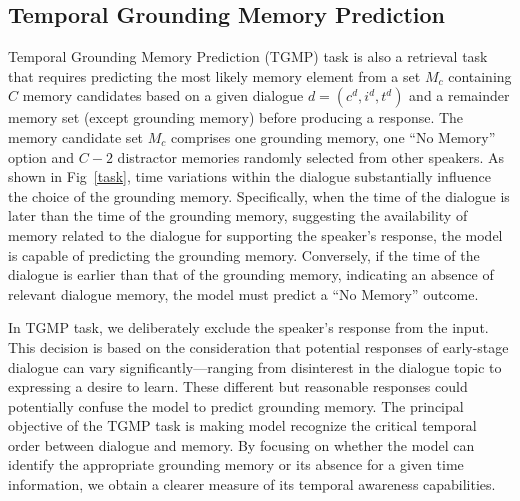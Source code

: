 

\subsection{Temporal Grounding Memory Prediction}

Temporal Grounding Memory Prediction (TGMP) task is also a retrieval task that requires predicting the most likely memory element from a set $M_c$ containing $C$ memory candidates based on a given dialogue $d=(c^{d}, {i}^{d}, t^{d})$ and a remainder memory set (except grounding memory) before producing a response. The memory candidate set $M_c$ comprises one grounding memory, one ``No Memory'' option and $C-2$ distractor memories randomly selected from other speakers. As shown in Fig~\ref{task}, time variations within the dialogue substantially influence the choice of the grounding memory. Specifically, when the time of the dialogue is later than the time of the grounding memory, suggesting the availability of memory related to the dialogue for supporting the speaker’s response, the model is capable of predicting the grounding memory. Conversely, if the time of the dialogue is earlier than that of the grounding memory, indicating an absence of relevant dialogue memory, the model must predict a ``No Memory'' outcome.

In TGMP task, we deliberately exclude the speaker's response from the input. This decision is based on the consideration that potential responses of early-stage dialogue can vary significantly—ranging from disinterest in the dialogue topic to expressing a desire to learn. These different but reasonable responses could potentially confuse the model to predict grounding memory. The principal objective of the TGMP task is making model recognize the critical temporal order between dialogue and memory. %
By focusing on whether the model can identify the appropriate grounding memory or its absence for a given time information, we obtain a clearer measure of its temporal awareness capabilities.
